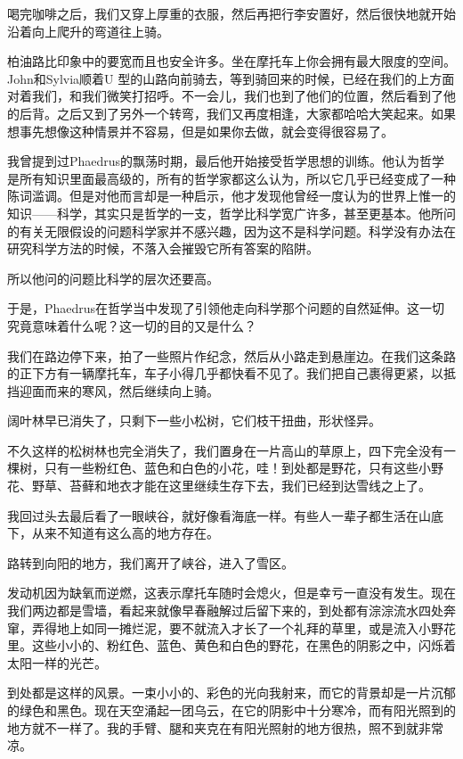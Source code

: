 \documentclass[UTF8]{article}
\begin{document}
\par 喝完咖啡之后，我们又穿上厚重的衣服，然后再把行李安置好，然后很快地就开始沿着向上爬升的弯道往上骑。
\par 柏油路比印象中的要宽而且也安全许多。坐在摩托车上你会拥有最大限度的空间。John和Sylvia顺着U 型的山路向前骑去，等到骑回来的时候，已经在我们的上方面对着我们，和我们微笑打招呼。不一会儿，我们也到了他们的位置，然后看到了他的后背。之后又到了另外一个转弯，我们又再度相逢，大家都哈哈大笑起来。如果想事先想像这种情景并不容易，但是如果你去做，就会变得很容易了。
\par 我曾提到过Phaedrus的飘荡时期，最后他开始接受哲学思想的训练。他认为哲学是所有知识里面最高级的，所有的哲学家都这么认为，所以它几乎已经变成了一种陈词滥调。但是对他而言却是一种启示，他才发现他曾经一度认为的世界上惟一的知识——科学，其实只是哲学的一支，哲学比科学宽广许多，甚至更基本。他所问的有关无限假设的问题科学家并不感兴趣，因为这不是科学问题。科学没有办法在研究科学方法的时候，不落入会摧毁它所有答案的陷阱。
\par 所以他问的问题比科学的层次还要高。
\par 于是，Phaedrus在哲学当中发现了引领他走向科学那个问题的自然延伸。这一切究竟意味着什么呢？这一切的目的又是什么？
\par 我们在路边停下来，拍了一些照片作纪念，然后从小路走到悬崖边。在我们这条路的正下方有一辆摩托车，车子小得几乎都快看不见了。我们把自己裹得更紧，以抵挡迎面而来的寒风，然后继续向上骑。
\par 阔叶林早已消失了，只剩下一些小松树，它们枝干扭曲，形状怪异。
\par 不久这样的松树林也完全消失了，我们置身在一片高山的草原上，四下完全没有一棵树，只有一些粉红色、蓝色和白色的小花，哇！到处都是野花，只有这些小野花、野草、苔藓和地衣才能在这里继续生存下去，我们已经到达雪线之上了。
\par 我回过头去最后看了一眼峡谷，就好像看海底一样。有些人一辈子都生活在山底下，从来不知道有这么高的地方存在。
\par 路转到向阳的地方，我们离开了峡谷，进入了雪区。
\par 发动机因为缺氧而逆燃，这表示摩托车随时会熄火，但是幸亏一直没有发生。现在我们两边都是雪墙，看起来就像早春融解过后留下来的，到处都有淙淙流水四处奔窜，弄得地上如同一摊烂泥，要不就流入才长了一个礼拜的草里，或是流入小野花里。这些小小的、粉红色、蓝色、黄色和白色的野花，在黑色的阴影之中，闪烁着太阳一样的光芒。
\par 到处都是这样的风景。一束小小的、彩色的光向我射来，而它的背景却是一片沉郁的绿色和黑色。现在天空涌起一团乌云，在它的阴影中十分寒冷，而有阳光照到的地方就不一样了。我的手臂、腿和夹克在有阳光照射的地方很热，照不到就非常凉。
\end{document}
